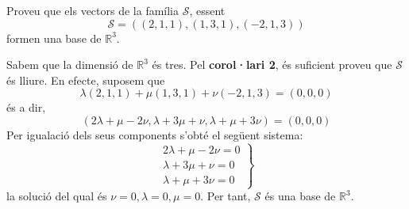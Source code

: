 \begin{exemple}
Proveu que els vectors de la família $\mathcal{S}$, essent 
\begin{equation*}
\mathcal{S}=((2,1,1),(1,3,1),(-2,1,3))
\end{equation*}
formen una base de $\mathbb{R}^{3}$.

\end{exemple}
\begin{solucio}
Sabem que la dimensió de $\mathbb{R}^{3}$ és tres. Pel \textbf{%
corol·lari 2}, és suficient proveu que $\mathcal{S}$ és lliure. En efecte,
suposem que%
\begin{equation*}
\lambda (2,1,1)+\mu (1,3,1)+\nu (-2,1,3)=(0,0,0)
\end{equation*}%
és a dir,%
\begin{equation*}
(2\lambda +\mu -2\nu ,\lambda +3\mu +\nu ,\lambda +\mu +3\nu )=(0,0,0)
\end{equation*}%
Per igualació dels seus components s’obté el següent sistema:%
\begin{equation*}
\left. 
\begin{array}{r}
2\lambda +\mu -2\nu =0 \\ 
\lambda +3\mu +\nu =0 \\ 
\lambda +\mu +3\nu =0%
\end{array}%
\right\}
\end{equation*}%
la solució del qual és $\nu =0,\lambda =0,\mu =0$. Per tant, $\mathcal{S}$ és
una base de $\mathbb{R}^{3}$.
\end{solucio}

